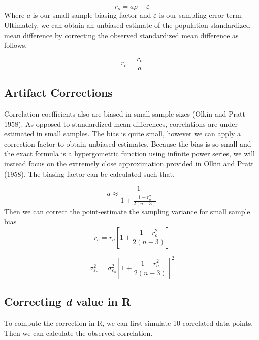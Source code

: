 \documentclass[
  letterpaper,
  DIV=11,
  numbers=noendperiod]{scrreprt}
\begin{document}
\[
r_o = a\rho+\varepsilon
\] Where \(a\) is our small sample biasing factor and \(\varepsilon\) is
our sampling error term. Ultimately, we can obtain an unbiased estimate
of the population standardized mean difference by correcting the
observed standardized mean difference as follows,

\[
r_c = \frac{r_o}{a}
\]

\hypertarget{artifact-corrections-1}{%
\subsection{Artifact Corrections}\label{artifact-corrections-1}}

Correlation coefficients also are biased in small sample sizes (Olkin
and Pratt 1958). As opposed to standardized mean differences,
correlations are under-estimated in small samples. The bias is quite
small, however we can apply a correction factor to obtain unbiased
estimates. Because the bias is so small and the exact formula is a
hypergometric function using infinite power series, we will instead
focus on the extremely close approximation provided in Olkin and Pratt
(1958). The biasing factor can be calculated such that,

\[
a \approx \frac{1}{1+\frac{1-r_o^2}{2(n-3)}} 
\] Then we can correct the point-estimate the sampling variance for
small sample bias \[
r_c = r_o\left[ 1+\frac{1-r_o^2}{2(n-3)}\right]
\]

\[
\sigma^2_{\varepsilon_c} = \sigma^2_{\varepsilon_o}\left[ 1+\frac{1-r_o^2}{2(n-3)}\right]^2
\]

\hypertarget{correcting-d-value-in-r-1}{%
\subsection{\texorpdfstring{Correcting \emph{d} value in
R}{Correcting d value in R}}\label{correcting-d-value-in-r-1}}

To compute the correction in R, we can first simulate 10 correlated data
points. Then we can calculate the observed correlation.
\end{document}
